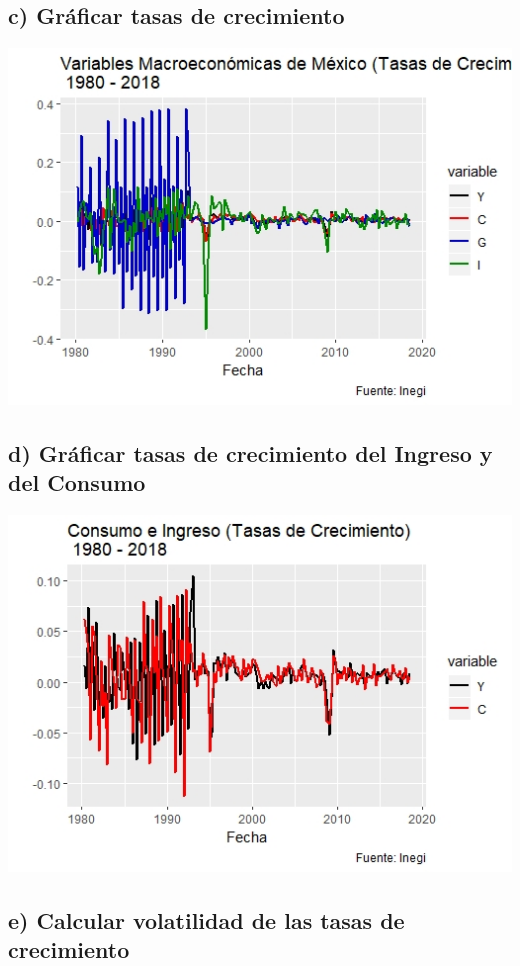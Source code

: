 \documentclass[11pt,a4paper]{article}
\begin{document}
\subsection*{c) Gráficar tasas de crecimiento}

\includegraphics{plotTasas}

\subsection*{d) Gráficar tasas de crecimiento del Ingreso y del Consumo}
\includegraphics{plotTasas2}


\subsection*{e) Calcular volatilidad de las tasas de crecimiento}
\end{document}
